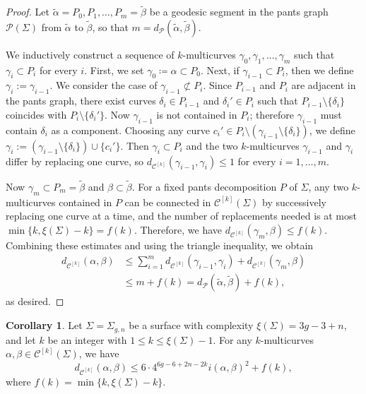 \documentclass[a4paper,11pt]{amsart}
\numberwithin{equation}{section}
\theoremstyle{definition}
\newtheorem{corollary}[theorem]{Corollary}
\newcommand{\multicurve}[1]{\mathcal{C}^{[#1]}}
\begin{document}
\begin{proof}
Let $\tilde{\alpha}=P_0,P_1,\ldots,P_m=\tilde{\beta}$ be a geodesic segment in the pants graph $\mathcal{P}(\Sigma)$ from $\tilde{\alpha}$ to $\tilde{\beta}$, so that
$m=d_{\mathcal{P}}(\tilde{\alpha},\tilde{\beta})$.

We inductively construct a sequence of $k$-multicurves $\gamma_0,\gamma_1,\ldots,\gamma_m $ such that
$\gamma_i\subset P_i$ for every $i$.
First, we set $\gamma_0\coloneqq \alpha\subset P_0$.
Next, if $\gamma_{i-1}\subset P_i$, then we define $\gamma_i:=\gamma_{i-1}$.
We consider the case of $\gamma_{i-1}\not\subset P_i$.
Since $P_{i-1}$ and $P_i$ are adjacent in the pants graph, there exist curves $\delta_i\in P_{i-1}$ and $\delta_i'\in P_i$ such that $P_{i-1}\setminus\{\delta_i\}$ coincides with $P_i\setminus\{\delta_i'\}$.
Now $\gamma_{i-1}$ is not contained in $P_i$; therefore $\gamma_{i-1}$ must contain $\delta_i$ as a component.
Choosing any curve $c_i'\in P_i\setminus(\gamma_{i-1}\setminus\{\delta_i\})$,
we define $\gamma_i:=(\gamma_{i-1}\setminus\{\delta_i\})\cup\{c_i'\}$.
Then $\gamma_i\subset P_i$ and the two $k$-multicurves $\gamma_{i-1}$ and $\gamma_i$ differ by replacing one curve, so $d_{\multicurve{k}}(\gamma_{i-1},\gamma_i)\leq 1$ for every $i=1,\ldots,m$.

Now $\gamma_m\subset P_m=\tilde{\beta}$ and $\beta\subset \tilde{\beta}$.
For a fixed pants decomposition $P$ of $\Sigma$, any two $k$-multicurves contained in $P$ can be
connected in $\multicurve{k}(\Sigma)$ by successively replacing one curve at a time, and the number of
replacements needed is at most $\min\{k,\xi(\Sigma)-k\}=f(k)$.
Therefore, we have $d_{\multicurve{k}}(\gamma_m,\beta)\le f(k)$.
Combining these estimates and using the triangle inequality, we obtain
\begin{align*}
    d_{\multicurve{k}}(\alpha,\beta) &\leq \sum_{i=1}^m d_{\multicurve{k}}(\gamma_{i-1},\gamma_i) + d_{\multicurve{k}}(\gamma_m,\beta) \\
    & \leq m+f(k) =d_{\mathcal{P}}(\tilde{\alpha},\tilde{\beta})+f(k),
\end{align*}
as desired.
\end{proof}


\begin{corollary}\label{corollary:UpperBoundForTheK-multicurveDistance}
    Let $\Sigma=\Sigma_{g,n}$ be a surface with complexity $\xi(\Sigma)=3g-3+n$, and let $k$ be an integer with $1\le k\le \xi(\Sigma)-1$.
    For any $k$-multicurves $\alpha,\beta\in\multicurve{k}(\Sigma)$, we have 
    \begin{equation*}
        d_{\multicurve{k}}(\alpha,\beta)\leq 6\cdot 4^{6g-6+2n-2k}i(\alpha,\beta)^2+f(k),
    \end{equation*}
    where $f(k)=\min\{k,\xi(\Sigma)-k\}$.
\end{corollary}
\end{document}
